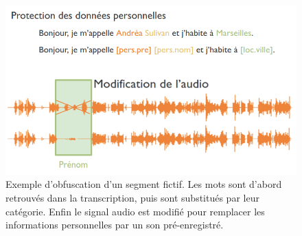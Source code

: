 \begin{figure}[h]
  \centering
  \includegraphics[width=15cm]{./Chapitre4/figures/annony.png}
  \caption{Exemple d'obfuscation d'un segment fictif. Les mots sont d'abord retrouvés dans la transcription, puis sont substitués par leur catégorie. Enfin le signal audio est modifié pour remplacer les informations personnelles par un son pré-enregistré.}
  \label{fig:annony}
\end{figure}
